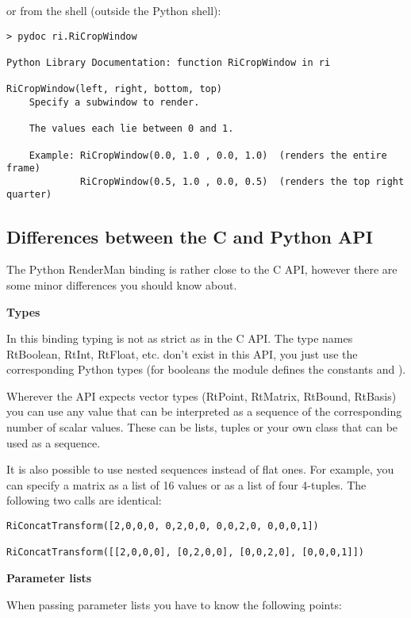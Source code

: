 or from the shell (outside the Python shell):

\begin{verbatim}
> pydoc ri.RiCropWindow

Python Library Documentation: function RiCropWindow in ri

RiCropWindow(left, right, bottom, top)
    Specify a subwindow to render.

    The values each lie between 0 and 1.

    Example: RiCropWindow(0.0, 1.0 , 0.0, 1.0)  (renders the entire frame)
             RiCropWindow(0.5, 1.0 , 0.0, 0.5)  (renders the top right quarter)
\end{verbatim}

\subsection{Differences between the C and Python API}

The Python RenderMan binding is rather close to the C API, however
there are some minor differences you should know about.

{\bf Types}

In this binding typing is not as strict as in the C API. The type names
RtBoolean, RtInt, RtFloat, etc. don't exist in this API, you just use
the corresponding Python types (for booleans the module defines the
constants  and ).

Wherever the API expects vector types (RtPoint, RtMatrix, RtBound,
RtBasis) you can use any value that can be interpreted as a sequence
of the corresponding number of scalar values. These can be lists,
tuples or your own class that can be used as a sequence.

It is also possible to use nested sequences instead of flat ones. For
example, you can specify a matrix as a list of 16 values or as a list
of four 4-tuples. The following two calls are identical:

\begin{verbatim}
RiConcatTransform([2,0,0,0, 0,2,0,0, 0,0,2,0, 0,0,0,1]) 

RiConcatTransform([[2,0,0,0], [0,2,0,0], [0,0,2,0], [0,0,0,1]])
\end{verbatim}

{\bf Parameter lists}

When passing parameter lists you have to know the following points:


